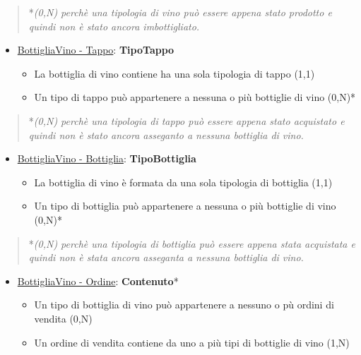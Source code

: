 \begin{verse}
	*\emph{(0,N) perchè una tipologia di vino può essere appena stato prodotto e quindi non è stato ancora imbottigliato.}
\end{verse}

\begin{itemize}
	\item \underline{BottigliaVino - Tappo}: \textbf{TipoTappo}
	
	\begin{itemize}
		\item La bottiglia di vino contiene ha una sola tipologia di tappo (1,1)
		\item Un tipo di tappo può appartenere a nessuna o più bottiglie di vino (0,N)*
	\end{itemize}
	
\end{itemize}

\begin{verse}
	*\emph{(0,N) perchè una tipologia di tappo può essere appena stato acquistato e quindi non è stato ancora asseganto a nessuna bottiglia di vino.}
\end{verse}

\begin{itemize}
	\item \underline{BottigliaVino - Bottiglia}: \textbf{TipoBottiglia}
	
	\begin{itemize}
		\item La bottiglia di vino è formata da una sola tipologia di bottiglia (1,1)
		\item Un tipo di bottiglia può appartenere a nessuna o più bottiglie di vino (0,N)*
	\end{itemize}
	
\end{itemize}

\begin{verse}
	*\emph{(0,N) perchè una tipologia di bottiglia può essere appena stata acquistata e quindi non è stata ancora asseganta a nessuna bottiglia di vino.}
\end{verse}

\begin{itemize}
	\item \underline{BottigliaVino - Ordine}: \textbf{Contenuto}*
	
	\begin{itemize}
		\item Un tipo di bottiglia di vino può appartenere a nessuno o pù ordini di vendita (0,N)
		\item Un ordine di vendita contiene da uno a più tipi di bottiglie di vino (1,N)
	\end{itemize}
	
\end{itemize}

